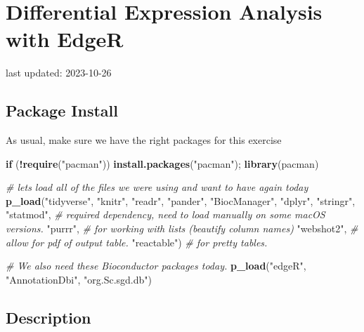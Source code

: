 \documentclass[
]{book}
\newenvironment{Shaded}{\begin{snugshade}}{\end{snugshade}}
\newcommand{\CommentTok}[1]{\textcolor[rgb]{0.56,0.35,0.01}{\textit{#1}}}
\newcommand{\ControlFlowTok}[1]{\textcolor[rgb]{0.13,0.29,0.53}{\textbf{#1}}}
\newcommand{\FunctionTok}[1]{\textcolor[rgb]{0.13,0.29,0.53}{\textbf{#1}}}
\newcommand{\NormalTok}[1]{#1}
\newcommand{\SpecialCharTok}[1]{\textcolor[rgb]{0.81,0.36,0.00}{\textbf{#1}}}
\newcommand{\StringTok}[1]{\textcolor[rgb]{0.31,0.60,0.02}{#1}}
\begin{document}
\hypertarget{differential-expression-analysis-with-edger}{%
\chapter{Differential Expression Analysis with EdgeR}\label{differential-expression-analysis-with-edger}}

last updated: 2023-10-26

\hypertarget{package-install-1}{%
\section{Package Install}\label{package-install-1}}

As usual, make sure we have the right packages for this exercise

\begin{Shaded}
\begin{Highlighting}[]
\ControlFlowTok{if}\NormalTok{ (}\SpecialCharTok{!}\FunctionTok{require}\NormalTok{(}\StringTok{"pacman"}\NormalTok{)) }\FunctionTok{install.packages}\NormalTok{(}\StringTok{"pacman"}\NormalTok{); }\FunctionTok{library}\NormalTok{(pacman)}

\CommentTok{\# let\textquotesingle{}s load all of the files we were using and want to have again today}
\FunctionTok{p\_load}\NormalTok{(}\StringTok{"tidyverse"}\NormalTok{, }\StringTok{"knitr"}\NormalTok{, }\StringTok{"readr"}\NormalTok{,}
       \StringTok{"pander"}\NormalTok{, }\StringTok{"BiocManager"}\NormalTok{, }
       \StringTok{"dplyr"}\NormalTok{, }\StringTok{"stringr"}\NormalTok{, }
       \StringTok{"statmod"}\NormalTok{, }\CommentTok{\# required dependency, need to load manually on some macOS versions.}
       \StringTok{"purrr"}\NormalTok{, }\CommentTok{\# for working with lists (beautify column names)}
       \StringTok{"webshot2"}\NormalTok{, }\CommentTok{\# allow for pdf of output table.}
       \StringTok{"reactable"}\NormalTok{) }\CommentTok{\# for pretty tables.}

\CommentTok{\# We also need these Bioconductor packages today.}
\FunctionTok{p\_load}\NormalTok{(}\StringTok{"edgeR"}\NormalTok{, }\StringTok{"AnnotationDbi"}\NormalTok{, }\StringTok{"org.Sc.sgd.db"}\NormalTok{)}
\end{Highlighting}
\end{Shaded}

\hypertarget{description-2}{%
\section{Description}\label{description-2}}
\end{document}
